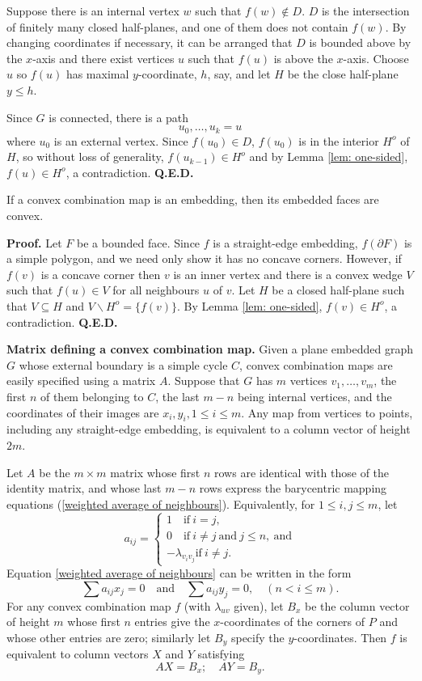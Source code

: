 Suppose there is an internal vertex $w$ such that
$f(w)\notin D.$  $D$ is the intersection of finitely many
closed half-planes, and one of them
does not contain $f(w).$  By changing coordinates if
necessary, it can be arranged that $D$ is bounded above
by the $x$-axis and there exist vertices $u$
such that $f(u)$ is above the $x$-axis.
Choose $u$ so $f(u)$ has maximal $y$-coordinate, $h$, say, and
let $H$ be the close half-plane $y \leq h$.

Since $G$ is connected, there is a path
$$ u_0, \ldots , u_k = u $$ where $u_0$ is an external
vertex.  Since $f(u_0) \in D$, $f(u_0)$ is in the interior $H^o$
of $H$,
so without loss of generality, $f(u_{k-1})\in H^o$ and
by Lemma \ref{lem: one-sided}, $f(u)\in H^o$, a contradiction.
{\bf Q.E.D.}\medskip

\begin{lemma}
\label{lem: conv comb emb conv faces}
If a convex combination map is an embedding, then its
embedded faces are convex.
\end{lemma}

{\bf Proof.} Let $F$ be a bounded face.
Since $f$ is a straight-edge embedding, $f(\partial F)$
is a simple polygon, and we need only show it has
no concave corners.  However, if $f(v)$ is a concave
corner then $v$ is an inner vertex and
there is a convex wedge $V$ such that $f(u)\in V$
for all neighbours $u$ of $v$. Let $H$ be a closed
half-plane such that $V\subseteq H$ and $V\backslash H^o
=\{f(v)\}$. By Lemma \ref{lem: one-sided}, $f(v)\in H^o$, a contradiction.
{\bf Q.E.D.}\medskip


\numpara
\label{matrix defining a convex combination map} {\bf Matrix defining a convex combination map.} Given
a plane embedded graph $G$ whose external boundary
is a simple cycle $C$, convex combination maps are easily specified
using a matrix $A$.  Suppose that $G$ has
$m$ vertices $v_1,\ldots,v_m$, the first $n$ of them
belonging to $C$, the last $m-n$ being
internal vertices, and the coordinates of their
images are $x_i, y_i, 1 \leq i \leq m$.  Any map from
vertices to points, including any straight-edge
embedding, is equivalent to a column vector of height $2m$.

Let $A$ be the $m\times m$ matrix whose first
$n$ rows are identical with those of the identity
matrix, and whose
last $m-n$ rows express the barycentric mapping
equations (\ref{weighted average of neighbours}). Equivalently,
for $1 \leq i,j \leq m$, let
$$ a_{ij} = \begin{cases}
1\quad\text{if}~i=j,\\
0\quad\text{if}~ i \not= j ~\text{and}~ j \leq n,~\text{and}\\
-\lambda_{v_iv_j} \text{if} ~ i \not= j.
\end{cases}
$$ Equation
\ref{weighted average of neighbours} can be written in
the form
$$ \sum a_{ij} x_j = 0\quad\text{and}\quad \sum a_{ij}y_j = 0,
\quad ( n < i \leq m).$$ For
any convex combination map $f$ (with
$\lambda_{uv}$ given), let $B_x$ be the column vector of
height $m$
whose first $n$ entries give the $x$-coordinates
of the corners of $P$
and whose other entries are zero; similarly
let $B_y$ specify the $y$-coordinates. Then $f$ is
equivalent to column vectors $X$ and $Y$ satisfying
$$ AX = B_x;\quad AY = B_y.$$


